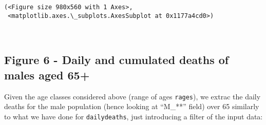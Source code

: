\documentclass[11pt]{article}
\makeatletter
\newcommand{\boxspacing}{\kern\kvtcb@left@rule\kern\kvtcb@boxsep}
\newcommand{\prompt}[4]{
        \ttfamily\llap{{\color{#2}[#3]:\hspace{3pt}#4}}\vspace{-\baselineskip}
    }
\makeatother
\begin{document}
            \begin{tcolorbox}[breakable, size=fbox, boxrule=.5pt, pad at break*=1mm, opacityfill=0]
\prompt{Out}{outcolor}{56}{\boxspacing}
\begin{Verbatim}[commandchars=\\\{\}]
(<Figure size 980x560 with 1 Axes>,
 <matplotlib.axes.\_subplots.AxesSubplot at 0x1177a4cd0>)
\end{Verbatim}
\end{tcolorbox}
        
    \begin{center}
    \end{center}
    { \hspace*{\fill} \\}
    
    \hypertarget{figure-6---daily-and-cumulated-deaths-of-males-aged-65}{%
\subsection{Figure 6 - Daily and cumulated deaths of males aged
65+}\label{figure-6---daily-and-cumulated-deaths-of-males-aged-65}}

    Given the age classes considered above (range of ages \texttt{rages}),
we extrac the daily deaths for the male population (hence looking at
``M\_**'' field) over 65 similarly to what we have done for
\texttt{dailydeaths}, just introducing a filter of the input data:
\end{document}
